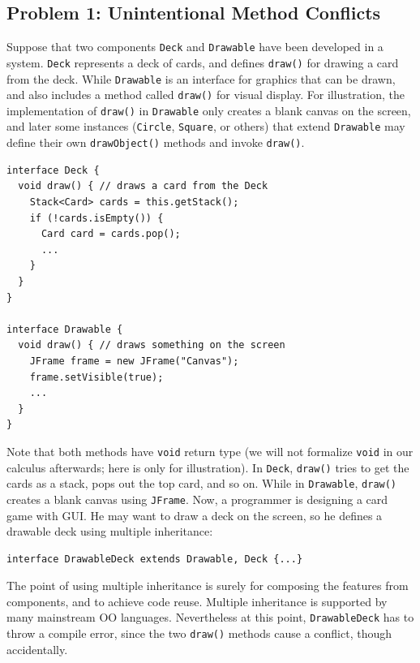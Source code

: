 \subsection{Problem 1: Unintentional Method Conflicts}
Suppose that two components \lstinline|Deck| and \lstinline|Drawable| 
have been developed in a system.  \lstinline|Deck| represents a deck
of cards, and defines \lstinline|draw()| for drawing a card from the
deck.  While \lstinline|Drawable| is an interface for graphics that
can be drawn, and also includes a method called \lstinline|draw()| for
visual display. For illustration, the implementation of
\lstinline|draw()| in \lstinline|Drawable| only creates a blank canvas
on the screen, and later some instances (\lstinline|Circle|,
\lstinline|Square|, or others) that extend \lstinline|Drawable| may
define their own \lstinline|drawObject()| methods and invoke
\lstinline|draw()|.

\vspace{3pt}\begin{lstlisting}
interface Deck {
  void draw() { // draws a card from the Deck
    Stack<Card> cards = this.getStack();
    if (!cards.isEmpty()) {
      Card card = cards.pop();
      ...
    }
  }
}

interface Drawable {
  void draw() { // draws something on the screen
    JFrame frame = new JFrame("Canvas");
    frame.setVisible(true);
    ...
  }
}
\end{lstlisting}\vspace{3pt}
Note that both methods have \lstinline|void| return type (we will not formalize
\lstinline|void| in our calculus afterwards; here is only for illustration). In \lstinline|Deck|, \lstinline|draw()| tries to get the cards as a stack, pops
out the top card, and so on. While in \lstinline|Drawable|, \lstinline|draw()|
creates a blank canvas using \lstinline|JFrame|. Now, a programmer is designing a
card game with GUI. He may want to draw a deck on the screen, so he defines a drawable
deck using multiple inheritance:

\vspace{3pt}\begin{lstlisting}
interface DrawableDeck extends Drawable, Deck {...} 
\end{lstlisting}\vspace{3pt}
The point of using multiple inheritance is surely for composing the features from
components, and to achieve code reuse. Multiple inheritance is supported by many mainstream OO
languages. Nevertheless at this point, \lstinline|DrawableDeck| has to throw a compile
error, since the two \lstinline|draw()| methods cause a conflict, though accidentally.

